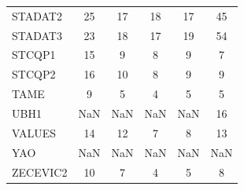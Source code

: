 \begin{longtable}{lccccc}
STADAT2 & 25 & 17 & 18 & 17 & 45 \\
STADAT3 & 23 & 18 & 17 & 19 & 54 \\
STCQP1 & 15 & 9 & 8 & 9 & 7 \\
STCQP2 & 16 & 10 & 8 & 9 & 9 \\
TAME & 9 & 5 & 4 & 5 & 5 \\
UBH1 & NaN & NaN & NaN & NaN & 16 \\
VALUES & 14 & 12 & 7 & 8 & 13 \\
YAO & NaN & NaN & NaN & NaN & NaN \\
ZECEVIC2 & 10 & 7 & 4 & 5 & 8 \\
\end{longtable}
